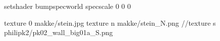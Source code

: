 setshader bumpspecworld
specscale 0 0 0

texture 0 makke/stein.jpg
texture n makke/stein_N.png
//texture s philipk2/pk02_wall_big01a_S.png
